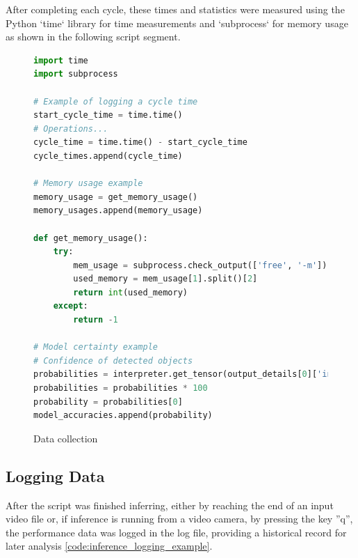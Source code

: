 \newpage
After completing each cycle, these times and statistics were measured using the Python `time` library for time measurements and `subprocess` for memory usage as shown in the following script segment.


\begin{figure}[H]
\begin{lstlisting}[language=Python]
import time
import subprocess

# Example of logging a cycle time
start_cycle_time = time.time()
# Operations...
cycle_time = time.time() - start_cycle_time
cycle_times.append(cycle_time)

# Memory usage example
memory_usage = get_memory_usage()
memory_usages.append(memory_usage)

def get_memory_usage():
    try:
        mem_usage = subprocess.check_output(['free', '-m']).decode('utf-8').split('\n')
        used_memory = mem_usage[1].split()[2]
        return int(used_memory)
    except:
        return -1

# Model certainty example
# Confidence of detected objects
probabilities = interpreter.get_tensor(output_details[0]['index'])[0]
probabilities = probabilities * 100
probability = probabilities[0]
model_accuracies.append(probability)
\end{lstlisting}
\caption{Data collection}
\label{code:inference_measuring_example}
\end{figure}

\subsection{Logging Data}
After the script was finished inferring, either by reaching the end of an input video file or, if inference is running from a video camera, by pressing the key ''q'', the performance data was logged in the log file, providing a historical record for later analysis \ref{code:inference_logging_example}.

